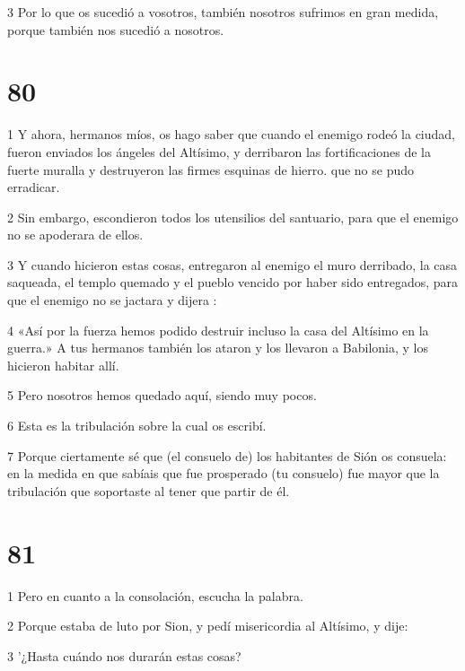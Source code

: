 \par 3 Por lo que os sucedió a vosotros, también nosotros sufrimos en gran medida, porque también nos sucedió a nosotros.

\chapter{80}

\par 1 Y ahora, hermanos míos, os hago saber que cuando el enemigo rodeó la ciudad, fueron enviados los ángeles del Altísimo, y derribaron las fortificaciones de la fuerte muralla y destruyeron las firmes esquinas de hierro. que no se pudo erradicar.

\par 2 Sin embargo, escondieron todos los utensilios del santuario, para que el enemigo no se apoderara de ellos.

\par 3 Y cuando hicieron estas cosas, entregaron al enemigo el muro derribado, la casa saqueada, el templo quemado y el pueblo vencido por haber sido entregados, para que el enemigo no se jactara y dijera :

\par 4 «Así por la fuerza hemos podido destruir incluso la casa del Altísimo en la guerra.» A tus hermanos también los ataron y los llevaron a Babilonia, y los hicieron habitar allí.

\par 5 Pero nosotros hemos quedado aquí, siendo muy pocos.

\par 6 Esta es la tribulación sobre la cual os escribí.

\par 7 Porque ciertamente sé que (el consuelo de) los habitantes de Sión os consuela: en la medida en que sabíais que fue prosperado (tu consuelo) fue mayor que la tribulación que soportaste al tener que partir de él.

\chapter{81}

\par 1 Pero en cuanto a la consolación, escucha la palabra.

\par 2 Porque estaba de luto por Sion, y pedí misericordia al Altísimo, y dije:

\par 3 '¿Hasta cuándo nos durarán estas cosas?

